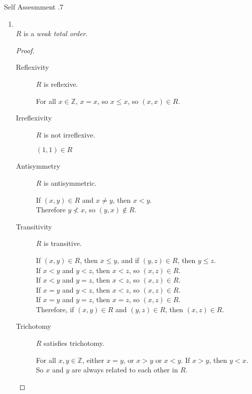 \documentclass[../notes.tex]{subfiles}
\begin{document}
\begin{exercise}{Self Assesmment \thechapter.7}
\begin{enumerate}
						\item {}\\
							$R$ is a \emph{weak total order}.
							\begin{proof}
								$ $
								\begin{description}
									\item[Reflexivity] $R$ is reflexive.
										\begin{subproof}
											For all $x \in \mathbb{Z}$, $x = x$, so $x \leq x$, so $(x, x) \in R$.
										\end{subproof}
									\item[Irreflexivity] $R$ is not irreflexive.
										\begin{subproof}[Counterexample]
											$(1, 1) \in R$
										\end{subproof}
									\item[Antisymmetry] $R$ is antisymmetric.
										\begin{subproof}
											If $(x, y) \in R$ and $x \neq y$, then $x < y$.\\
											Therefore $y \not < x$, so $(y, x) \notin R$.
										\end{subproof}
									\pagebreak
									\item[Transitivity] $R$ is transitive.
										\begin{subproof}
											If $(x, y) \in R$, then $x \leq y$, and
											if $(y, z) \in R$, then $y \leq z$.\\
											If $x < y$ and $y < z$, then $x < z$, so $(x, z) \in R$.\\
											If $x < y$ and $y = z$, then $x < z$, so $(x, z) \in R$.\\
											If $x = y$ and $y < z$, then $x < z$, so $(x, z) \in R$.\\
											If $x = y$ and $y = z$, then $x = z$, so $(x, z) \in R$.\\
											Therefore, if $(x, y) \in R$ and $(y, z) \in R$, then $(x, z) \in R$. 
										\end{subproof}
									\item[Trichotomy] $R$ satisfies trichotomy.
										\begin{subproof}
											For all $x, y \in \mathbb{Z}$, either $x = y$, or $x > y$ or $x < y$. If $x > y$, then $y < x$. So $x$ and $y$ are always related to each other in $R$.
										\end{subproof}
								\end{description}

\end{proof}
\end{enumerate}
\end{exercise}
\end{document}
